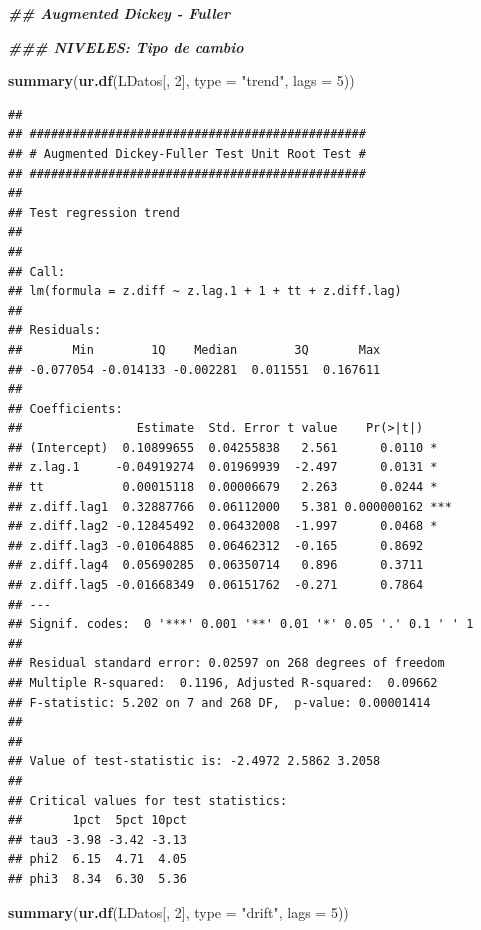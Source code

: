 \documentclass[
]{book}
\newenvironment{Shaded}{\begin{snugshade}}{\end{snugshade}}
\newcommand{\AttributeTok}[1]{\textcolor[rgb]{0.13,0.29,0.53}{#1}}
\newcommand{\DecValTok}[1]{\textcolor[rgb]{0.00,0.00,0.81}{#1}}
\newcommand{\DocumentationTok}[1]{\textcolor[rgb]{0.56,0.35,0.01}{\textbf{\textit{#1}}}}
\newcommand{\FunctionTok}[1]{\textcolor[rgb]{0.13,0.29,0.53}{\textbf{#1}}}
\newcommand{\NormalTok}[1]{#1}
\newcommand{\StringTok}[1]{\textcolor[rgb]{0.31,0.60,0.02}{#1}}
\begin{document}
\begin{Shaded}
\begin{Highlighting}[]
\DocumentationTok{\#\# Augmented Dickey {-} Fuller}

\DocumentationTok{\#\#\# NIVELES: Tipo de cambio}

\FunctionTok{summary}\NormalTok{(}\FunctionTok{ur.df}\NormalTok{(LDatos[, }\DecValTok{2}\NormalTok{], }\AttributeTok{type =} \StringTok{"trend"}\NormalTok{, }\AttributeTok{lags =} \DecValTok{5}\NormalTok{))}
\end{Highlighting}
\end{Shaded}

\begin{verbatim}
## 
## ############################################### 
## # Augmented Dickey-Fuller Test Unit Root Test # 
## ############################################### 
## 
## Test regression trend 
## 
## 
## Call:
## lm(formula = z.diff ~ z.lag.1 + 1 + tt + z.diff.lag)
## 
## Residuals:
##       Min        1Q    Median        3Q       Max 
## -0.077054 -0.014133 -0.002281  0.011551  0.167611 
## 
## Coefficients:
##                Estimate  Std. Error t value    Pr(>|t|)    
## (Intercept)  0.10899655  0.04255838   2.561      0.0110 *  
## z.lag.1     -0.04919274  0.01969939  -2.497      0.0131 *  
## tt           0.00015118  0.00006679   2.263      0.0244 *  
## z.diff.lag1  0.32887766  0.06112000   5.381 0.000000162 ***
## z.diff.lag2 -0.12845492  0.06432008  -1.997      0.0468 *  
## z.diff.lag3 -0.01064885  0.06462312  -0.165      0.8692    
## z.diff.lag4  0.05690285  0.06350714   0.896      0.3711    
## z.diff.lag5 -0.01668349  0.06151762  -0.271      0.7864    
## ---
## Signif. codes:  0 '***' 0.001 '**' 0.01 '*' 0.05 '.' 0.1 ' ' 1
## 
## Residual standard error: 0.02597 on 268 degrees of freedom
## Multiple R-squared:  0.1196, Adjusted R-squared:  0.09662 
## F-statistic: 5.202 on 7 and 268 DF,  p-value: 0.00001414
## 
## 
## Value of test-statistic is: -2.4972 2.5862 3.2058 
## 
## Critical values for test statistics: 
##       1pct  5pct 10pct
## tau3 -3.98 -3.42 -3.13
## phi2  6.15  4.71  4.05
## phi3  8.34  6.30  5.36
\end{verbatim}

\begin{Shaded}
\begin{Highlighting}[]
\FunctionTok{summary}\NormalTok{(}\FunctionTok{ur.df}\NormalTok{(LDatos[, }\DecValTok{2}\NormalTok{], }\AttributeTok{type =} \StringTok{"drift"}\NormalTok{, }\AttributeTok{lags =} \DecValTok{5}\NormalTok{))}
\end{Highlighting}
\end{Shaded}
\end{document}
